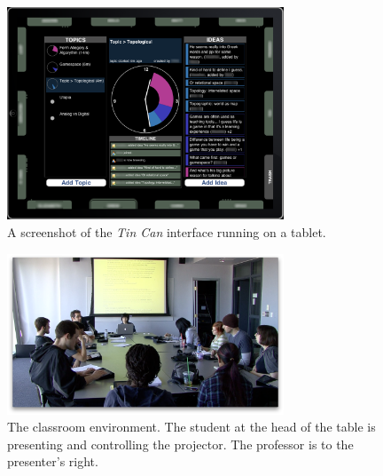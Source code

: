 








\begin{figure}[t]
\centering
\includegraphics[width=3.25in]{figures/tincan/tincan_interface.png}
\caption{A screenshot of the \emph{Tin Can} interface running on a tablet.}
\label{f:interface}
\end{figure}

\begin{figure}[t]
\centering
\includegraphics[width=3.25in]{figures/tincan/classroom_overview.png}
\caption{The classroom environment. The student at the head of the table is presenting and controlling the projector. The professor is to the presenter's right.}
\label{f:classroom}
\end{figure}

